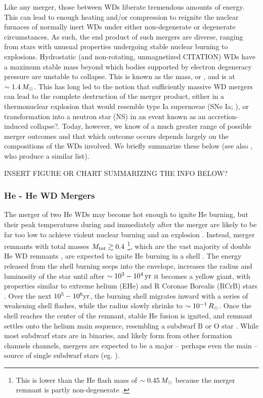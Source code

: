 Like any merger, those between WDs liberate tremendous amounts of energy.  This can lead to enough heating and/or compression to reignite the nuclear furnaces of normally inert WDs under either non-degenerate or degenerate circumstances.  As such, the end product of such mergers are diverse, ranging from stars with unusual properties undergoing stable nuclear burning to explosions. Hydrostatic (and non-rotating, unmagnetized {\charles CITATION}) WDs have a maximum stable mass beyond which bodies supported by electron degeneracy pressure are unstable to collapse.  This is known as the \cite{chan31} mass, or \Mch, and is at $\sim1.4\,\Msun$.  This has long led to the notion that sufficiently massive WD mergers can lead to the complete destruction of the merger product, either in a thermonuclear explosion that would resemble type Ia supernovae (SNe Ia; \citealt{webb84}), or transformation into a neutron star (NS) in an event known as an accretion-induced collapse{\charles \citep{nomoi85}?}.  Today, however, we know of a much greater range of possible merger outcomes and that which outcome occurs depends largely on the compositions of the WDs involved.  We briefly summarize these below (see also \citealt{dan+14}, who produce a similar list).

{\charles INSERT FIGURE OR CHART SUMMARIZING THE INFO BELOW?}

\subsubsection{He - He WD Mergers}


The merger of two He WDs may become hot enough to ignite He burning, but their peak temperatures during and immediately after the merger are likely to be far too low to achieve violent nuclear burning and an explosion \citep{dan+12,dan+14,dan+15}.  Instead, merger remnants with total masses $\Mtot\gtrsim 0.4$ \citep{han+02}\footnote{This is lower than the He flash mass of $\sim0.45\,\Msun$ because the merger remnant is partly non-degenerate \citep{han+02}.}, which are the vast majority of double He WD remnants \citep{nele10}, are expected to ignite He burning in a shell \citep{saioj00,zhanj12}.  The energy released from the shell burning seeps into the envelope, increases the radius and luminosity of the star until after $\sim 10^3-10^4\,\mathrm{yr}$ it becomes a yellow giant, with properties similar to extreme helium (EHe) and R Coronae Borealis (RCrB) stars {\charles \citep{saioj00, zhanj12}.}  Over the next $10^5-10^6\mathrm{yr}$, the burning shell migrates inward with a series of weakening shell flashes, while the radius slowly shrinks to $\sim10^{-1}\,\Rsun$.  Once the shell reaches the center of the remnant, stable He fusion is ignited, and remnant settles onto the helium main sequence, resembling a subdwarf B or O star \citep{saioj00, justph11, zhanj12}.  While most subdwarf stars are in binaries, and likely form from other formation channels channels, mergers are expected to be a major -- perhaps even the main -- source of single subdwarf stars (eg. \citealt{han+03, nele10}).

